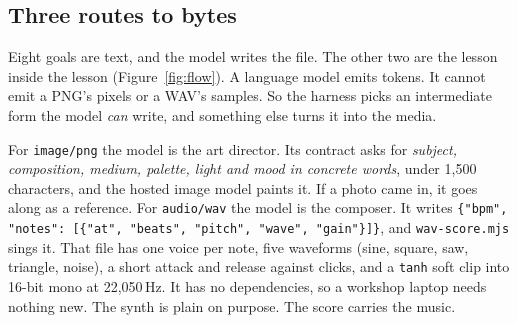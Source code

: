 \documentclass[10pt,letterpaper,twocolumn]{article}
\newcommand{\code}[1]{\texttt{#1}}
\begin{document}
\subsection{Three routes to bytes}
Eight goals are text, and the model writes the file. The other two are the
lesson inside the lesson (Figure~\ref{fig:flow}). A language model emits
tokens. It cannot emit a PNG's pixels or a WAV's samples. So the harness
picks an intermediate form the model \emph{can} write, and something else
turns it into the media.

For \code{image/png} the model is the art director. Its contract asks for
\emph{subject, composition, medium, palette, light and mood in concrete
words}, under 1,500 characters, and the hosted image model paints it. If a
photo came in, it goes along as a reference. For \code{audio/wav} the model
is the composer. It writes \code{\{"bpm", "notes": [\{"at", "beats",
"pitch", "wave", "gain"\}]\}}, and \code{wav-score.mjs} sings it. That file
has one voice per note, five waveforms (sine, square, saw, triangle,
noise), a short attack and release against clicks, and a \code{tanh} soft
clip into 16-bit mono at 22,050\,Hz. It has no dependencies, so a workshop
laptop needs nothing new. The synth is plain on purpose. The score carries
the music.
\end{document}
